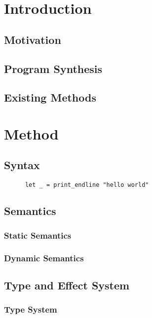 \documentclass[12pt, a4paper, titlepage]{report}
\begin{document}
\chapter{Introduction} \label{section:introduction}
  \section{Motivation}
    \cite{bodik:2015}
  \section{Program Synthesis}
    \cite{gulwani:2017}
  \section{Existing Methods}

\chapter{Method}\label{section:method}
  \section{Syntax}
    \begin{verbatim}
      let _ = print_endline "hello world"
    \end{verbatim}
  \section{Semantics}
    \subsection{Static Semantics} %
    \subsection{Dynamic Semantics} %
  \section{Type and Effect System}
    \subsection{Type System}
\end{document}
